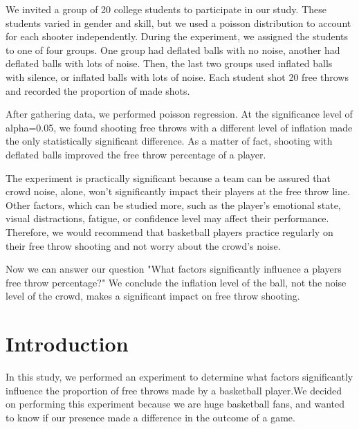 \documentclass[12pt]{article}\usepackage[]{graphicx}\usepackage[]{color}
\begin{document}
\hspace{1cm}We invited a group of 20 college students to participate in our study. These students varied in gender and skill, but we used a poisson distribution to account for each shooter independently. During the experiment, we assigned the students to one of four groups. One group had deflated balls with no noise, another had deflated balls with lots of noise. Then, the last two groups used inflated balls with silence, or inflated balls with lots of noise. Each student shot 20 free throws and recorded the proportion of made shots. 

\hspace{1cm}After gathering data, we performed poisson regression. At the significance level of alpha=0.05, we found shooting free throws with a different level of inflation made the only statistically significant difference. As a matter of fact, shooting with deflated balls improved the free throw percentage of a player.

\hspace{1cm}The experiment is practically significant because a team can be assured that crowd noise, alone, won't significantly impact their players at the free throw line. Other factors, which can be studied more, such as the player's emotional state, visual distractions, fatigue, or confidence level may affect their performance. Therefore, we would recommend that basketball players practice regularly on their free throw shooting and not worry about the crowd's noise.

\hspace{1cm}Now we can answer our question "What factors significantly influence a players free throw percentage?" We conclude the inflation level of the ball, not the noise level of the crowd, makes a significant impact on free throw shooting.\\



\newpage

\section{Introduction}

In this study, we performed an experiment to determine what factors significantly influence the proportion of free throws made by a basketball player.We decided on performing this experiment because we are huge basketball fans, and wanted to know if our presence made a difference in the outcome of a game. 
\end{document}
